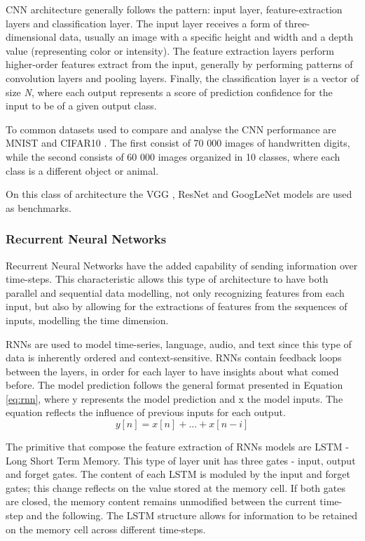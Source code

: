 CNN architecture generally follows the pattern: input layer, feature-extraction layers and classification layer. The input layer receives a form of three-dimensional data, usually an image with a specific height and width and a depth value (representing color or intensity). The feature extraction layers perform higher-order features extract from the input, generally by performing patterns of convolution layers and pooling layers. Finally, the classification layer is a vector of size \textit{N}, where each output represents a score of prediction confidence for the input to be of a given output class.

To common datasets used to compare and analyse the CNN  performance are MNIST \cite{noauthor_mnist_nodate} and CIFAR10 \cite{noauthor_cifar-10_nodate}. The first consist of 70 000 images of handwritten digits, while the second consists of 60 000 images organized in 10 classes, where each class is a different object or animal.

On this class of architecture the VGG \cite{simonyan_very_2015}, ResNet \cite{he_deep_2015} and     GoogLeNet \cite{szegedy_going_2014} models are used as benchmarks.

\subsubsection{Recurrent Neural Networks}

Recurrent Neural Networks have the added capability of sending information over time-steps. This characteristic allows this type of architecture to have both parallel and sequential data modelling, not only recognizing features from each input, but also by allowing for the extractions of features from the sequences of inputs, modelling the time dimension. 

RNNs are used to model time-series, language, audio, and text since this type of data is inherently ordered and context-sensitive. RNNs contain feedback loops between the layers, in order for each layer to have insights about what comed before. The model prediction follows the general format presented in Equation \ref{eq:rnn}, where y represents the model prediction and x the model inputs. The equation reflects the influence of previous inputs for each output.
\begin{equation}
    \label{eq:rnn}
    y[n] = x[n] + ... + x[n-i]
\end{equation}

The primitive that compose the feature extraction of RNNs models are LSTM - Long Short Term Memory. This type of layer unit has three gates - input, output and forget gates. The content of each LSTM is moduled by the input and forget gates; this change reflects on the value stored at the memory cell. If both gates are closed, the memory content remains unmodified between the current time-step and the following. The LSTM structure allows for information to be retained on the memory cell across different time-steps.
